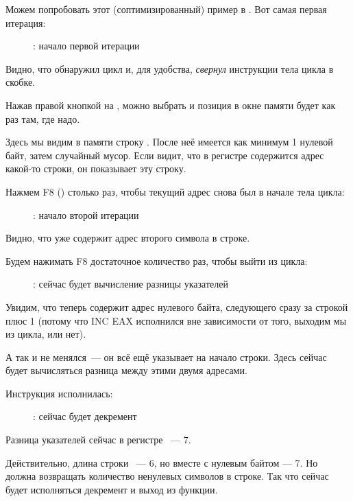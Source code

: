 ﻿\clearpage
{}
\myindex{\olly}

Можем попробовать этот (соптимизированный) пример в \olly.  Вот самая первая итерация:

\begin{figure}[H]
\centering
{}
\caption{\olly: начало первой итерации}
\label{fig:strlen_olly_1}
\end{figure}

Видно, что \olly обнаружил цикл и, для удобства, \emph{свернул} инструкции тела цикла в скобке.

Нажав правой кнопкой на \EAX, можно выбрать  
и позиция в окне памяти будет как раз там, где надо.

Здесь мы видим в памяти строку .
После неё имеется как минимум 1 нулевой байт, затем случайный мусор.
Если \olly видит, что в регистре содержится адрес какой-то строки, он показывает эту строку.

\clearpage
Нажмем F8 (\stepover) столько раз, чтобы текущий адрес снова был в начале тела цикла:

\begin{figure}[H]
\centering
{}
\caption{\olly: начало второй итерации}
\label{fig:strlen_olly_2}
\end{figure}

Видно, что \EAX уже содержит адрес второго символа в строке.

\clearpage
Будем нажимать F8 достаточное количество раз, чтобы выйти из цикла:

\begin{figure}[H]
\centering
{}
\caption{\olly: сейчас будет вычисление разницы указателей}
\label{fig:strlen_olly_3}
\end{figure}

Увидим, что \EAX теперь содержит адрес нулевого байта, следующего сразу за строкой плюс 1 (потому что INC EAX исполнился вне зависимости
от того, выходим мы из цикла, или нет).

А \EDX так и не менялся~--- он всё ещё указывает на начало строки.
Здесь сейчас будет вычисляться разница между этими двумя адресами.

\clearpage
Инструкция \SUB исполнилась:

\begin{figure}[H]
\centering
{}
\caption{\olly: сейчас будет декремент \EAX}
\label{fig:strlen_olly_4}
\end{figure}

Разница указателей сейчас в регистре \EAX~--- 7.

Действительно, длина строки ~--- 6, 
но вместе с нулевым байтом --- 7.
Но  должна возвращать количество ненулевых символов в строке.
Так что сейчас будет исполняться декремент и выход из функции.

